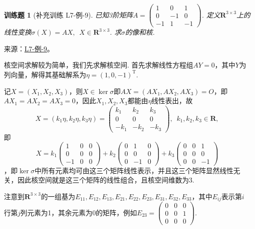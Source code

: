 \documentclass[UTF8,12pt,a4paper,fontset=fandol]{ctexart}
\newtheorem{exercise}{训练题}[section]
\begin{document}
\begin{exercise}[补充训练 L7-例-9]\label{prob:L7-例-9}
已知3阶矩阵$A=\begin{pmatrix}
            1 & 0 & 1 \\ 0 & -1 & 0 \\ -1 & 1 & -1
        \end{pmatrix}$. 定义$\mathbf{R}^{3 \times 3}$上的线性变换$\sigma(X)=AX,\enspace X \in \mathbf{R}^{3 \times 3}$. 求$\sigma$的像和核.
\end{exercise}
\noindent 来源：\href{https://github.com/yhwu-is/Linear-Algebra-Left-Undone/blob/new/%E8%AE%B2%E4%B9%89/%E4%B8%93%E9%A2%98/7%20%E7%BA%BF%E6%80%A7%E6%98%A0%E5%B0%84%E7%9F%A9%E9%98%B5%E8%A1%A8%E7%A4%BA%E4%B8%8E%E7%9F%A9%E9%98%B5%E8%BF%90%E7%AE%97%E5%9F%BA%E7%A1%80.tex}{L7-例-9}。
\begin{solve}
核空间求解较为简单，我们先求解核空间. 首先求解线性方程组$AY=0$，其中$Y$为列向量，解得其基础解系为$\eta=(1,0,-1)^\mathrm{T}$.

    记$X=(X_1,X_2,X_3)$，则$X\in\ker\sigma$即$AX=(AX_1,AX_2,AX_3)=O$，即$AX_1=AX_2=AX_3=0$，因此$X_1,X_2,X_3$都能由$\eta$线性表出，故
    \[X=(k_1\eta,k_2\eta,k_3\eta)=\begin{pmatrix}
            k_1 & k_2 & k_3 \\ 0 & 0 & 0 \\ -k_1 & -k_2 & -k_3
        \end{pmatrix},\enspace k_1,k_2,k_3\in\mathbf{R},\]
    即
\[X=k_1\begin{pmatrix}
            1 & 0 & 0 \\ 0 & 0 & 0 \\ -1 & 0 & 0
        \end{pmatrix}+k_2\begin{pmatrix}
            0 & 1 & 0 \\ 0 & 0 & 0 \\ 0 & -1 & 0
        \end{pmatrix}+k_3\begin{pmatrix}
            0 & 0 & 1 \\ 0 & 0 & 0 \\ 0 & 0 & -1
        \end{pmatrix}\]
，即$\ker\sigma$中所有元素均可由这三个矩阵线性表示，并且这三个矩阵显然线性无关，因此核空间就是这三个矩阵的线性组合，且核空间维数为3.

    注意到$\mathbf{R}^{3 \times 3}$的一组基为$E_{11},E_{12},E_{13},E_{21},E_{22},E_{23},E_{31},E_{32},E_{33}$，其中$E_{ij}$表示第$i$行第$j$列元素为1，其余元素为0的矩阵，例如$E_{23}=\begin{pmatrix}
            0 & 0 & 0 \\ 0 & 0 & 1 \\ 0 & 0 & 0
        \end{pmatrix}$.


\end{solve}
\end{document}
